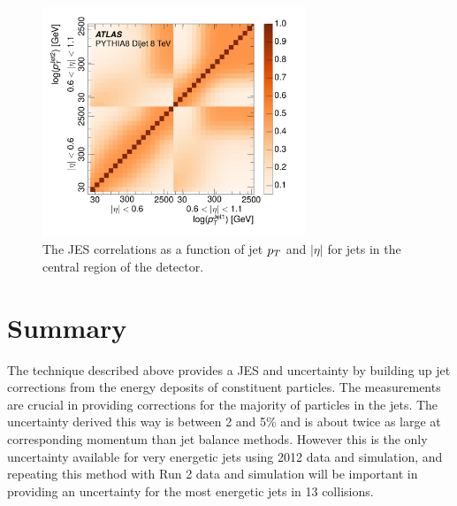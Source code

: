 \begin{figure}[ht]
\centering
\includegraphics[width=0.7\textwidth]{figures/correlation.pdf}
\caption{ The \ac{JES} correlations as a function of jet $p_T$ and $|\eta|$ for jets in the central region of the detector.}
\label{fig:jes_correlations}
\end{figure}

\section{Summary}
The technique described above provides a \acl{JES} and uncertainty by building up jet corrections from the energy deposits of constituent particles.
The \ep measurements are crucial in providing corrections for the majority of particles in the jets.
The uncertainty derived this way is between 2 and 5\% and is about twice as large at corresponding momentum than jet balance methods.
However this is the only uncertainty available for very energetic jets using 2012 data and simulation, and repeating this method with Run 2 data and simulation will be important in providing an uncertainty for the most energetic jets in 13 \TeV collisions.

